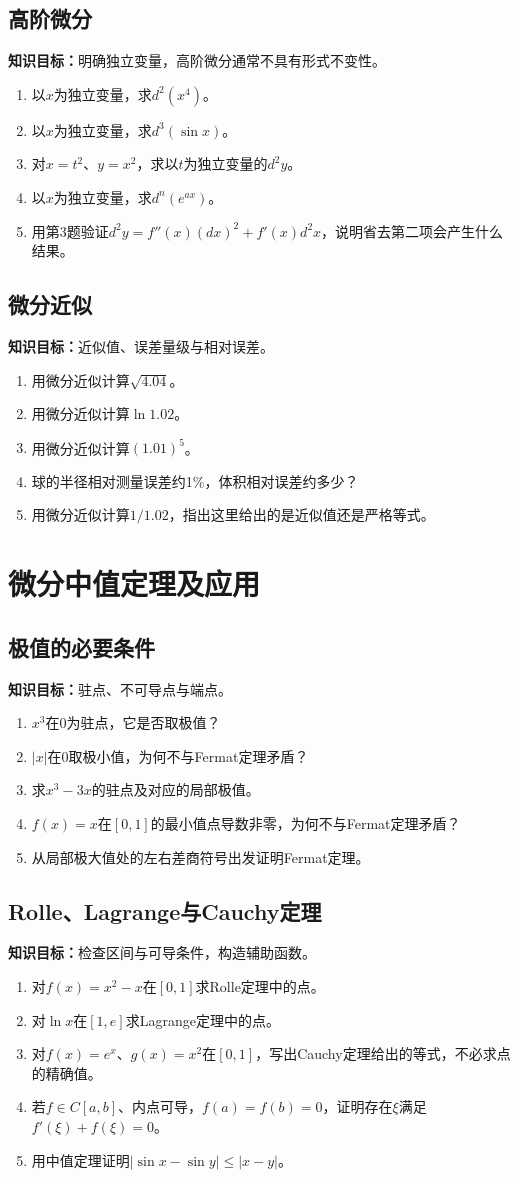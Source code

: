 \documentclass[11pt,a4paper,fontset=fandol]{ctexrep}
\newcommand{\goal}[1]{\textbf{知识目标：}#1\par}
\begin{document}
\subsection{高阶微分}
\goal{明确独立变量，高阶微分通常不具有形式不变性。}
\begin{enumerate}
\item 以$x$为独立变量，求$d^2(x^4)$。
\item 以$x$为独立变量，求$d^3(\sin x)$。
\item 对$x=t^2$、$y=x^2$，求以$t$为独立变量的$d^2y$。
\item 以$x$为独立变量，求$d^n(e^{ax})$。
\item 用第3题验证$d^2y=f''(x)(dx)^2+f'(x)d^2x$，说明省去第二项会产生什么结果。
\end{enumerate}
\subsection{微分近似}
\goal{近似值、误差量级与相对误差。}
\begin{enumerate}
\item 用微分近似计算$\sqrt{4.04}$。
\item 用微分近似计算$\ln1.02$。
\item 用微分近似计算$(1.01)^5$。
\item 球的半径相对测量误差约1\%，体积相对误差约多少？
\item 用微分近似计算$1/1.02$，指出这里给出的是近似值还是严格等式。
\end{enumerate}
\section{微分中值定理及应用}
\subsection{极值的必要条件}
\goal{驻点、不可导点与端点。}
\begin{enumerate}
\item $x^3$在0为驻点，它是否取极值？
\item $|x|$在0取极小值，为何不与Fermat定理矛盾？
\item 求$x^3-3x$的驻点及对应的局部极值。
\item $f(x)=x$在$[0,1]$的最小值点导数非零，为何不与Fermat定理矛盾？
\item 从局部极大值处的左右差商符号出发证明Fermat定理。
\end{enumerate}
\subsection{Rolle、Lagrange与Cauchy定理}
\goal{检查区间与可导条件，构造辅助函数。}
\begin{enumerate}
\item 对$f(x)=x^2-x$在$[0,1]$求Rolle定理中的点。
\item 对$\ln x$在$[1,e]$求Lagrange定理中的点。
\item 对$f(x)=e^x$、$g(x)=x^2$在$[0,1]$，写出Cauchy定理给出的等式，不必求点的精确值。
\item 若$f\in C[a,b]$、内点可导，$f(a)=f(b)=0$，证明存在$\xi$满足$f'(\xi)+f(\xi)=0$。
\item 用中值定理证明$|\sin x-\sin y|\le|x-y|$。
\end{enumerate}
\end{document}
